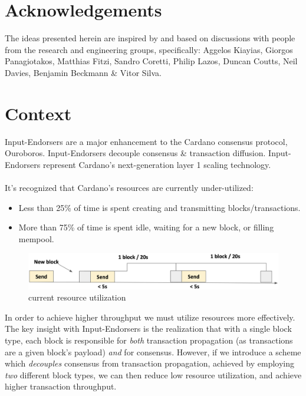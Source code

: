 \documentclass[11pt,a4paper]{article}
\begin{document}
\tableofcontents

\pagebreak

\section{Acknowledgements}
The ideas presented herein are inspired by and based on discussions with
people from the research and engineering groups, specifically: Aggelos Kiayias, 
Giorgos Panagiotakos, Matthias Fitzi, Sandro Coretti, Philip Lazos, Duncan Coutts,
Neil Davies, Benjamin Beckmann \& Vitor Silva.

\pagebreak

\section{Context}
Input-Endorsers are a major enhancement to the Cardano consensus protocol, Ouroboros.
Input-Endorsers decouple consensus \& transaction diffusion. Input-Endorsers represent 
Cardano's next-generation layer 1 scaling technology. \\ \\
It's recognized that Cardano's resources are currently under-utilized:

\begin{itemize}
  \item Less than 25\% of time is spent creating and transmitting blocks/transactions.
  \item More than 75\% of time is spent idle, waiting for a new block, or filling mempool.
\end{itemize}

\begin{figure}[ht]
  \includegraphics[width=\linewidth]{current_usage.png}
  \caption{current resource utilization}
  \label{fig:current utilization}
\end{figure}

In order to achieve higher throughput we must utilize resources more effectively.
The key insight with Input-Endorsers is the realization that with a single block
type, each block is responsible for \emph{both} transaction propagation (as transactions are a 
given block's payload) \emph{and} for consensus. However, if we introduce a scheme which 
\emph{decouples} consensus from transaction propagation, achieved by employing \emph{two} 
different block types, we can then reduce low resource utilization, and achieve higher
transaction throughput. \\
\end{document}
